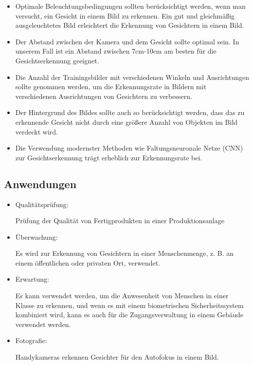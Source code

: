 \begin{itemize}
	\item Optimale Beleuchtungsbedingungen sollten berücksichtigt werden, wenn man versucht, ein Gesicht in einem Bild zu erkennen. Ein gut und gleichmäßig ausgeleuchtetes Bild erleichtert die Erkennung von Gesichtern in einem Bild.
	\item Der Abstand zwischen der Kamera und dem Gesicht sollte optimal sein. In unserem Fall ist ein Abstand zwischen 7cm-10cm am besten für die Gesichtserkennung geeignet.
	\item Die Anzahl der Trainingsbilder mit verschiedenen Winkeln und Ausrichtungen sollte genommen werden, um die Erkennungsrate in Bildern mit verschiedenen Ausrichtungen von Gesichtern zu verbessern.
	\item Der Hintergrund des Bildes sollte auch so berücksichtigt werden, dass das zu erkennende Gesicht nicht durch eine größere Anzahl von Objekten im Bild verdeckt wird.
	\item Die Verwendung modernster Methoden wie Faltungsneuronale Netze (CNN) zur Gesichtserkennung trägt erheblich zur Erkennungsrate bei.
\end{itemize}

\subsection{Anwendungen}

\begin{itemize}
	\item Qualitätsprüfung: 
	
	Prüfung der Qualität von Fertigprodukten in einer Produktionsanlage
	\item Überwachung: 
	
	Es wird zur Erkennung von Gesichtern in einer Menschenmenge, z. B. an einem öffentlichen oder privaten Ort, verwendet.
	\item Erwartung: 
	
	Es kann verwendet werden, um die Anwesenheit von Menschen in einer Klasse zu erkennen, und wenn es mit einem biometrischen Sicherheitssystem kombiniert wird, kann es auch für die Zugangsverwaltung in einem Gebäude verwendet werden.
	
	\item Fotografie: 
	
	Handykameras erkennen Gesichter für den Autofokus in einem Bild.
\end{itemize}
